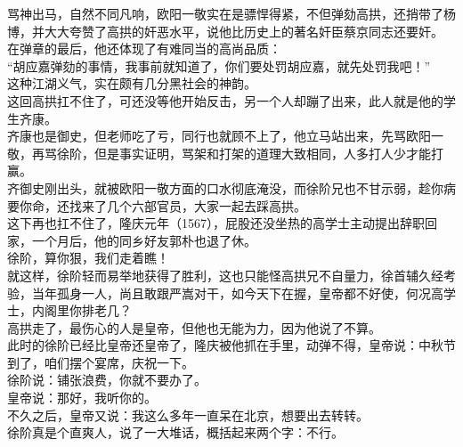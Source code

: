 \begin{multicols}{\theparacolNo}
骂神出马，自然不同凡响，欧阳一敬实在是骠悍得紧，不但弹劾高拱，还捎带了杨博，并大大夸赞了高拱的奸恶水平，说他比历史上的著名奸臣蔡京同志还要奸。\\

在弹章的最后，他还体现了有难同当的高尚品质：\\

“胡应嘉弹劾的事情，我事前就知道了，你们要处罚胡应嘉，就先处罚我吧！”\\

这种江湖义气，实在颇有几分黑社会的神韵。\\

这回高拱扛不住了，可还没等他开始反击，另一个人却蹦了出来，此人就是他的学生齐康。\\

齐康也是御史，但老师吃了亏，同行也就顾不上了，他立马站出来，先骂欧阳一敬，再骂徐阶，但是事实证明，骂架和打架的道理大致相同，人多打人少才能打赢。\\

齐御史刚出头，就被欧阳一敬方面的口水彻底淹没，而徐阶兄也不甘示弱，趁你病要你命，还找来了几个六部官员，大家一起去踩高拱。\\

这下再也扛不住了，隆庆元年（1567），屁股还没坐热的高学士主动提出辞职回家，一个月后，他的同乡好友郭朴也退了休。\\

徐阶，算你狠，我们走着瞧！\\

就这样，徐阶轻而易举地获得了胜利，这也只能怪高拱兄不自量力，徐首辅久经考验，当年孤身一人，尚且敢跟严嵩对干，如今天下在握，皇帝都不好使，何况高学士，内阁里你排老几？\\

高拱走了，最伤心的人是皇帝，但他也无能为力，因为他说了不算。\\

此时的徐阶已经比皇帝还皇帝了，隆庆被他抓在手里，动弹不得，皇帝说：中秋节到了，咱们摆个宴席，庆祝一下。\\

徐阶说：铺张浪费，你就不要办了。\\

皇帝说：那好，我听你的。\\

不久之后，皇帝又说：我这么多年一直呆在北京，想要出去转转。\\

徐阶真是个直爽人，说了一大堆话，概括起来两个字：不行。\\


\end{multicols}
